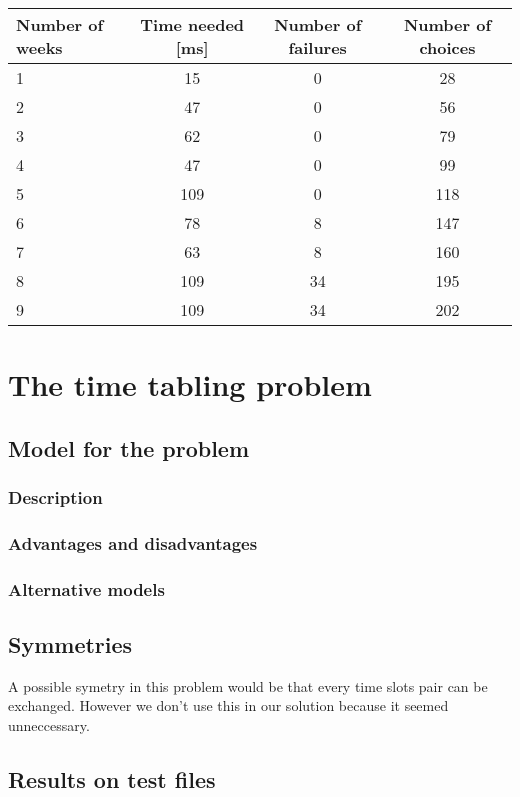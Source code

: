 \documentclass{eplDoc}
\begin{document}
\begin{center}
		\begin{tabular}{|l|c|c|c|}
			\hline
			Number of weeks & Time needed [ms] & Number of failures & Number of choices \\ 
			\hline
			1 & 15 & 0 & 28 \\ 
			2 & 47 & 0 & 56 \\ 
			3 & 62 & 0 & 79 \\ 
			4 & 47 & 0 & 99 \\ 
			5 & 109 & 0 & 118 \\ 
			6 & 78 & 8 & 147 \\ 
			7 & 63 & 8 & 160 \\ 
			8 & 109 & 34 & 195 \\ 
			9 & 109 & 34 & 202 \\ 
			\hline
		\end{tabular}
\end{center}



\section{The time tabling problem} 

\subsection{Model for the problem}
\subsubsection{Description}
\subsubsection{Advantages and disadvantages}
\subsubsection{Alternative models}

\subsection{Symmetries}

A possible symetry in this problem would be that every time slots pair can be exchanged. However we don't use this in our solution because it seemed unneccessary. 

\subsection{Results on test files}
\end{document}
